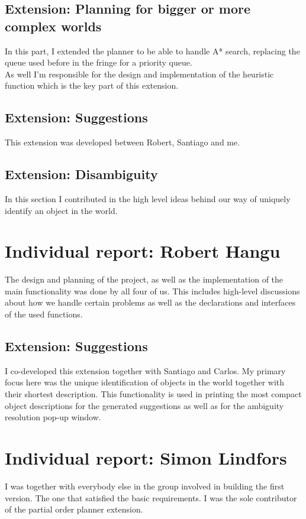 \documentclass[11pt]{article}
\begin{document}
\subsection{Extension: Planning for bigger or more complex worlds}

In this part, I extended the planner to be able to handle A* search, replacing 
the queue used before in the fringe for a priority queue.  \\

As well I'm responsible for the design and implementation of the heuristic 
function which is the key part of this extension.  \\

\subsection{Extension: Suggestions}

This extension was developed between Robert, Santiago and me.  \\

\subsection{Extension: Disambiguity}

In this section I contributed in the high level ideas behind our way of 
uniquely identify an object in the world.  \\

\section{Individual report: Robert Hangu}

The design and planning of the project, as well as the implementation of 
the main functionality was done by all four of us. This includes high-level 
discussions about how we handle certain problems as well as the declarations 
and interfaces of the used functions.

\subsection{Extension: Suggestions}

I co-developed this extension together with Santiago and Carlos. My primary 
focus here was the unique identification of objects in the world together with 
their shortest description. This functionality is used in printing the most 
compact object descriptions for the generated suggestions as well as for the 
ambiguity resolution pop-up window.

\section{Individual report: Simon Lindfors}

I was together with everybody else in the group involved in building the first 
version.  The one that satisfied the basic requirements.  I was the sole 
contributor of the partial order planner extension.
\end{document}
